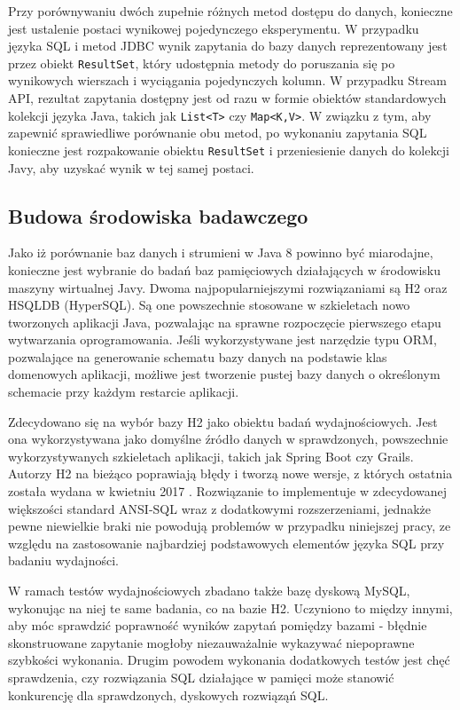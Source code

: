 \documentclass[12pt,twoside,openright]{extarticle}
\begin{document}
    Przy porównywaniu dwóch zupełnie różnych metod dostępu do danych, konieczne jest ustalenie postaci wynikowej pojedynczego eksperymentu. W przypadku języka SQL i metod JDBC wynik zapytania do bazy danych reprezentowany jest przez obiekt \texttt{ResultSet}, który udostępnia metody do poruszania się po wynikowych wierszach i wyciągania pojedynczych kolumn. W przypadku Stream API, rezultat zapytania dostępny jest od razu w formie obiektów standardowych kolekcji języka Java, takich jak \texttt{List<T>} czy \texttt{Map<K,V>}. W związku z tym, aby zapewnić sprawiedliwe porównanie obu metod, po wykonaniu zapytania SQL konieczne jest rozpakowanie obiektu \texttt{ResultSet} i przeniesienie danych do kolekcji Javy, aby uzyskać wynik w tej samej postaci.


\subsection{Budowa środowiska badawczego}

    Jako iż porównanie baz danych i strumieni w Java 8 powinno być miarodajne, konieczne jest wybranie do badań baz pamięciowych działających w środowisku maszyny wirtualnej Javy. Dwoma najpopularniejszymi rozwiązaniami są H2 oraz HSQLDB (HyperSQL). Są one powszechnie stosowane w szkieletach nowo tworzonych aplikacji Java, pozwalając na sprawne rozpoczęcie pierwszego etapu wytwarzania oprogramowania. Jeśli wykorzystywane jest narzędzie typu ORM, pozwalające na generowanie schematu bazy danych na podstawie klas domenowych aplikacji, możliwe jest tworzenie pustej bazy danych o określonym schemacie przy każdym restarcie aplikacji. 
    
    Zdecydowano się na wybór bazy H2 jako obiektu badań wydajnościowych. Jest ona wykorzystywana jako domyślne źródło danych w sprawdzonych, powszechnie wykorzystywanych szkieletach aplikacji, takich jak Spring Boot czy Grails. Autorzy H2 na bieżąco poprawiają błędy i tworzą nowe wersje, z których ostatnia została wydana w kwietniu 2017 \cite{h2maven}. Rozwiązanie to implementuje w zdecydowanej większości standard ANSI-SQL wraz z dodatkowymi rozszerzeniami, jednakże pewne niewielkie braki nie powodują problemów w przypadku niniejszej pracy, ze względu na zastosowanie najbardziej podstawowych elementów języka SQL przy badaniu wydajności.

    W ramach testów wydajnościowych zbadano także bazę dyskową MySQL, wykonując na niej te same badania, co na bazie H2. Uczyniono to między innymi, aby móc sprawdzić poprawność wyników zapytań pomiędzy bazami - błędnie skonstruowane zapytanie mogłoby niezauważalnie wykazywać niepoprawne szybkości wykonania. Drugim powodem wykonania dodatkowych testów jest chęć sprawdzenia, czy rozwiązania SQL działające w pamięci może stanowić konkurencję dla sprawdzonych, dyskowych rozwiąząń SQL.
\end{document}
